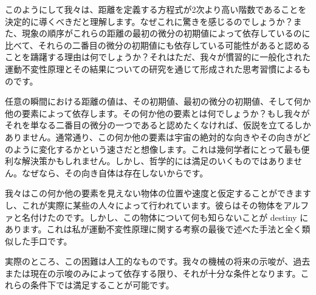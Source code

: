 \documentclass[a4paper,11pt,openany]{ltjsbook}
\begin{document}
このようにして我々は、距離を定義する方程式が2次より高い階数であることを決定的に導くべきだと理解します。なぜこれに驚きを感じるのでしょうか？また、現象の順序がこれらの距離の最初の微分の初期値によって依存しているのに比べて、それらの二番目の微分の初期値にも依存している可能性があると認めることを躊躇する理由は何でしょうか？それはただ、我々が慣習的に一般化された運動不変性原理とその結果についての研究を通じて形成された思考習慣によるものです。

任意の瞬間における距離の値は、その初期値、最初の微分の初期値、そして何か他の要素によって依存します。その何か他の要素とは何でしょうか？もし我々がそれを単なる二番目の微分の一つであると認めたくなければ、仮説を立てるしかありません。通常通り、この何か他の要素は宇宙の絶対的な向きやその向きがどのように変化するかという速さだと想像します。これは幾何学者にとって最も便利な解決策かもしれません。しかし、哲学的には満足のいくものではありません。なぜなら、その向き自体は存在しないからです。

我々はこの何か他の要素を見えない物体の位置や速度と仮定することができますし、これが実際に某些の人々によって行われています。彼らはその物体をアルファと名付けたのです。しかし、この物体について何も知らないことが destiny にあります。これは私が運動不変性原理に関する考察の最後で述べた手法と全く類似した手口です。

実際のところ、この困難は人工的なものです。我々の機械の将来の示唆が、過去または現在の示唆のみによって依存する限り、それが十分な条件となります。これらの条件下では満足することが可能です。
\end{document}

